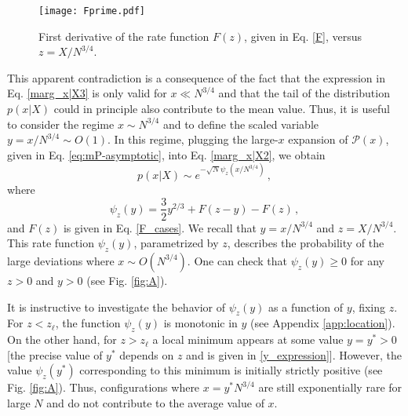 \documentclass[aps,pre,twocolumn,superscriptaddress,showpacs]{revtex4-1}
\newcommand{\be}{\begin{equation}}
\newcommand{\ee}{\end{equation}}
\newcommand{\mP}{\mathcal{P}}
\begin{document}
\begin{figure}
\texttt{[image: Fprime.pdf]}
\caption{First derivative of the rate function $F(z)$, given in Eq. \eqref{F}, versus $z=X/N^{3/4}$.}
\label{fig:Fprime}
\end{figure}



This apparent contradiction is a consequence of the fact that the expression in Eq. \eqref{marg_x|X3} is only valid for $x\ll N^{3/4}$ and that the tail of the distribution $p(x|X)$ could in principle also contribute to the mean value. Thus, it is useful to consider the regime $x\sim N^{3/4}$ and to define the scaled variable $y=x/ N^{3/4}\sim O(1)$. In this regime, plugging the large-$x$ expansion of $\mP(x)$, given in Eq. \eqref{eq:mP-asymptotic}, into Eq. \eqref{marg_x|X2}, we obtain
\be
p(x|X) \sim e^{-\sqrt{N}\psi_z(x/N^{3/4})}\,,
\label{marg_x|X4}
\ee
where
\begin{equation}
\psi_z(y)=\frac{3}{2}y^{2/3}+F(z-y)-F(z)\,,
\label{A_definition}
\end{equation}
and $F(z)$ is given in Eq. \eqref{F_cases}. We recall that $y=x/ N^{3/4}$ and $z=X /N^{3/4}$. This rate function $\psi_z(y)$, parametrized by $z$, describes the probability of the large deviations where $x\sim O(N^{3/4})$. One can check that $\psi_z(y)\geq 0$ for any $z>0$ and $y>0$ (see Fig. \ref{fig:A}). 


It is instructive to investigate the behavior of $\psi_z(y)$ as a function of $y$, fixing $z$. For $z<z_{\ell}$, the function $\psi_z(y)$ is monotonic in $y$ (see Appendix \ref{app:location}). On the other hand, for $z>z_{\ell}$ a local minimum appears at some value $y=y^*>0$ [the precise value of $y^*$ depends on $z$ and is given in \eqref{y_expression}]. However, the value $\psi_z(y^*)$ corresponding to this minimum is initially strictly positive (see Fig. \ref{fig:A}). Thus, configurations where $x=y^* N^{3/4}$ are still exponentially rare for large $N$ and do not contribute to the average value of $x$. 
\end{document}
